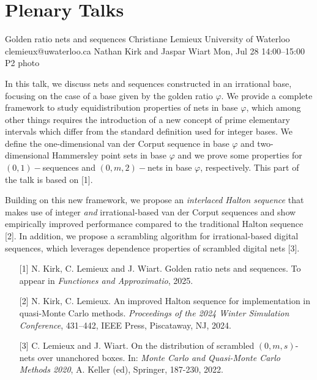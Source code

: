 \chapter{Plenary Talks}\newpage

\begin{talk}
  {Golden ratio nets and sequences}%
  {Christiane Lemieux}%
  {University of Waterloo}%
  {clemieux@uwaterloo.ca}%
  {Nathan Kirk and Jaspar Wiart}%
  {}%
  {Mon, Jul 28 14:00–15:00}%
  {P2}%
  {photo}%
  
				
			

In this talk, we discuss nets and sequences constructed in an irrational base, focusing on the case of a base given by the golden ratio $\varphi$. We provide a complete framework to study equidistribution properties of nets in base $\varphi$, which among other things requires the introduction of a new concept of prime elementary intervals which differ from the standard definition used for integer bases. We define the one-dimensional van der Corput sequence in base $\varphi$ and two-dimensional Hammersley point sets in base $\varphi$ and we prove some properties for $(0,1)-$sequences and $(0,m,2)-$nets in base $\varphi$, respectively. This part of the talk is based on [1].


Building on this new framework, we propose 
an {\em interlaced Halton sequence} that makes use of integer \textit{and} irrational-based van der Corput sequences and show empirically improved performance compared to the traditional Halton sequence [2]. In addition, we propose a scrambling algorithm for irrational-based digital sequences, which leverages dependence properties of scrambled digital nets [3].

\medskip

\begin{enumerate}
	\item[{[1]}] N. Kirk, C. Lemieux and J. Wiart. Golden ratio nets and sequences. To appear in {\em Functiones and Approximatio}, 2025.
	\item[{[2]}] N. Kirk, C. Lemieux. An improved Halton sequence for implementation in quasi-Monte Carlo methods. {\em Proceedings of the 2024 Winter Simulation Conference}, 431--442, IEEE Press, Piscataway, NJ, 2024. 
    \item[{[3]}] C. Lemieux and J. Wiart. On the distribution of scrambled $(0, m, s)$-nets over unanchored
boxes. In: {\em Monte Carlo and Quasi-Monte Carlo Methods 2020}, A. Keller (ed), 
Springer, 187-230, 2022.
\end{enumerate}

\end{talk}


